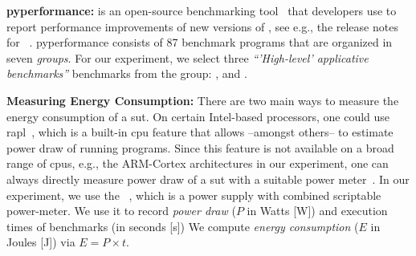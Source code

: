 \noindent\textbf{\acrlong{pyperformance}:} is an open-source benchmarking tool~\cite{pyperf_git} that \cp developers use to report performance improvements of new versions of \cp, see e.g., the release notes for ~\cite{py312}.
\gls{pyperformance} consists of 87 benchmark programs that are organized in seven \emph{groups}.
For our experiment, we select three \textit{``'High-level' applicative benchmarks''}\cite{pyperf_docs} benchmarks from the  group: ,  and .


\noindent\textbf{Measuring Energy Consumption:} There are two main ways to measure the energy consumption of a \gls{sut}.
On certain Intel-based processors, one could use \gls{rapl}~\cite{khan2018rapl}, which is a built-in \gls{cpu} feature that allows --amongst others-- to estimate power draw of running programs.
Since this feature is not available on a broad range of \glspl{cpu}, e.g., the ARM-Cortex architectures in our experiment, one can always directly measure power draw of a \gls{sut} with a suitable power meter~\cite{kavanagh2019rapid}.
In our experiment, we use the ~\cite{otii_website,qoitech2022otii}, which is a power supply with combined scriptable power-meter.
We use it to record \emph{power draw} ($P$ in Watts [W]) and execution times of benchmarks (in seconds [s])
We compute \emph{energy consumption} ($E$ in Joules [J]) via $E = P \times t$.